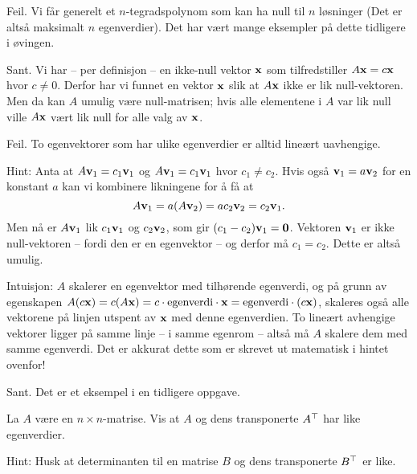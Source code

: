 \begin{losning}

\begin{punkt}
Feil. Vi får generelt et $n$-tegradspolynom som kan ha null til $n$ løsninger (Det er altså maksimalt $n$ egenverdier). Det har vært mange eksempler på dette tidligere i øvingen.
\end{punkt}

\begin{punkt}
Sant. Vi har -- per definisjon -- en ikke-null vektor $\mathbf{x}$ som tilfredstiller $A\mathbf{x}=c\mathbf{x}$ hvor $c\neq 0$. Derfor har vi funnet en vektor $\mathbf{x}$ slik at $A\mathbf{x}$ ikke er lik null-vektoren. Men da kan $A$ umulig være null-matrisen; hvis alle elementene i $A$ var lik null ville $A\mathbf{x}$ vært lik null for alle valg av $\mathbf{x}$.
\end{punkt}

\begin{punkt}
Feil. To egenvektorer som har ulike egenverdier er alltid lineært uavhengige. 

\noindent
Hint: Anta at $A\mathbf{v}_1=c_1\mathbf{v}_1$ og $A\mathbf{v}_1=c_1\mathbf{v}_1$ hvor $c_1\neq c_2$. Hvis også $\mathbf{v}_1=a\mathbf{v}_2$ for en konstant $a$ kan vi kombinere likningene for å få at $$A\mathbf{v}_1=a(A\mathbf{v}_2)=ac_2\mathbf{v}_2=c_2\mathbf{v}_1.$$ Men nå er $A\mathbf{v}_1$ lik $c_1\mathbf{v}_1$ og $c_2\mathbf{v}_2$, som gir $(c_1-c_2)\mathbf{v}_1=\mathbf{0}$. Vektoren $\mathbf{v}_1$ er ikke null-vektoren -- fordi den er en egenvektor -- og derfor må $c_1=c_2$. Dette er altså umulig.

\noindent
Intuisjon: $A$ skalerer en egenvektor med tilhørende egenverdi, og på grunn av egenskapen $A(c\mathbf{x})=c(A\mathbf{x})=c\cdot\text{egenverdi}\cdot\mathbf{x}=\text{egenverdi}\cdot(c\mathbf{x})$, skaleres også alle vektorene på linjen utspent av $\mathbf{x}$ med denne egenverdien. To lineært avhengige vektorer ligger på samme linje -- i samme egenrom -- altså må $A$ skalere dem med samme egenverdi. Det er akkurat dette som er skrevet ut matematisk i hintet ovenfor!
\end{punkt}

\begin{punkt}
Sant. Det er et eksempel i en tidligere oppgave.
\end{punkt}

\end{losning}

\begin{oppgave}
La $A$ være en $n\times n$-matrise. Vis at $A$ og dens transponerte $A^\top$ har like egenverdier.

\noindent
Hint: Husk at determinanten til en matrise $B$ og dens transponerte $B^\top$ er like.
\end{oppgave}

